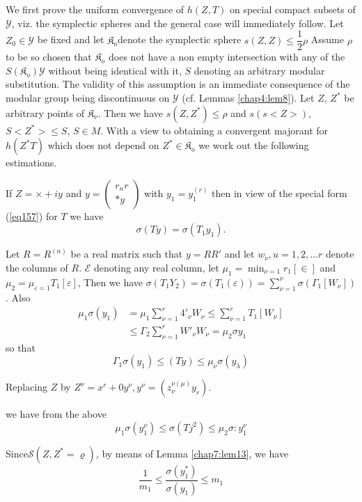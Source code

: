 We first prove the uniform convergence of $h (Z, T)$ on special
compact subsets of $\mathscr{Y}$, viz. the symplectic spheres and the
general case will immediately follow. Let $Z_0 \in \mathscr{Y}$ be
fixed and let $\mathfrak{K}_o$\pageoriginale  denote the symplectic
sphere $s (Z, Z) 
\leq \dfrac{1}{2}\rho$ Assume $\rho$ to be so chosen that
$\mathfrak{K}_o$ does not have a non empty intersection with any of the
$S (\mathfrak{K}_o) \mathscr{Y}$ without being identical with it, $S$
denoting an arbitrary modular substitution. The validity of this
assumption is an immediate consequence of the modular group being
discontinuous on $\mathscr{Y}$ (cf. Lemmas \ref{chap4:lem8}). Let $Z$, $Z^*$ be
arbitrary points of $\mathfrak{K}_\nu$. Then we have $s (Z, Z^*) \leq
\rho$ and $s (s <Z>)$, $S <Z^*> \leq S$, $S \in M$. With a view to
obtaining a convergent majorant for $h (Z^* T)$  which does not depend
on $Z^* \in \mathfrak{K}_o$ we work out the following estimations.  

If $Z = \times + i y$ and $y = \begin{pmatrix} r_n r \\ \ast
  y \end{pmatrix}$ with $y_1 = y^{(r)}_1$  then in view of the 
special form (\ref{eq157}) for $T$ we have 
$$
\sigma (T y) = \sigma (T_1 y_1). 
$$

Let $R = R^{(n)}$ be a real matrix such that $y = R R'$ and let $w_\nu
, u = 1, 2, \ldots r$ denote the columns of $R$. $\mathscr{E}$
denoting any real column, 
let $\mu_1 = \min_{\nu = 1} r_1 [\in]$ and $\mu_2 =
\mu_{\varepsilon=1} T_1 [\varepsilon]$, Then 
we have $\sigma (T_1 Y_2) = \sigma (T_1(\varepsilon)) =
\sum\limits^{\nu}_{\nu=1} \sigma (\Gamma_1 [W_\nu])$. 
Also
\begin{align*}
\mu_1 \sigma (y_1) & = \mu_1 \sum_{\nu = 1}^r   4'_\nu W_\nu \leq
\sum\limits^r_{\nu=1} T_1 [W_\nu]\\
& \leq \Gamma_2 \sum\limits^r_{\nu =1} W'_\nu W_\nu = \mu_2 \sigma y_1
\end{align*}
so that 
$$
\Gamma_1 \sigma (y_1) \leq (T y) \leq \mu_\nu \sigma (y_\lambda)
$$

Replacing $Z$ by $Z^\nu = x^r + 0 y^\nu, y^\nu = \left(
z^{\nu(\mu)}_\nu y_r\right)$.
 
\noindent
we have from the above
$$
\mu_1 \sigma (y^\nu_1) \leq \sigma (T j^2) \leq \mu_2 \sigma : y^\nu_1
$$

Since\pageoriginale $\mathscr{S}(Z, Z^* = \varrho)$, by means of Lemma
\ref{chap7:lem13}, we have 
$$
\frac{1}{m_1} \le \frac{\sigma(y^*_1)}{\sigma(y_1)} \le m_1
$$

